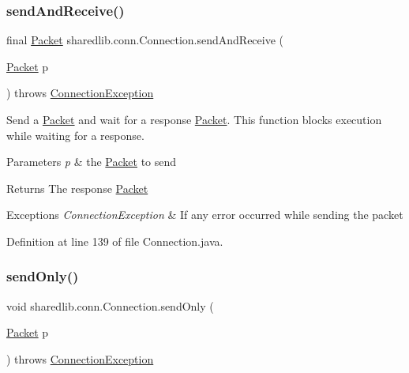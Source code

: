 \subsubsection{\texorpdfstring{send\+And\+Receive()}{sendAndReceive()}}
{\footnotesize\ttfamily final \hyperlink{classsharedlib_1_1conn_1_1_packet}{Packet} sharedlib.\+conn.\+Connection.\+send\+And\+Receive (\begin{DoxyParamCaption}\item[{\hyperlink{classsharedlib_1_1conn_1_1_packet}{Packet}}]{p }\end{DoxyParamCaption}) throws \hyperlink{classsharedlib_1_1exceptions_1_1_connection_exception}{Connection\+Exception}}

Send a \hyperlink{classsharedlib_1_1conn_1_1_packet}{Packet} and wait for a response \hyperlink{classsharedlib_1_1conn_1_1_packet}{Packet}. This function blocks execution while waiting for a response. 
\begin{DoxyParams}{Parameters}
{\em p} & the \hyperlink{classsharedlib_1_1conn_1_1_packet}{Packet} to send \\
\hline
\end{DoxyParams}
\begin{DoxyReturn}{Returns}
The response \hyperlink{classsharedlib_1_1conn_1_1_packet}{Packet} 
\end{DoxyReturn}

\begin{DoxyExceptions}{Exceptions}
{\em Connection\+Exception} & If any error occurred while sending the packet \\
\hline
\end{DoxyExceptions}


Definition at line 139 of file Connection.\+java.

\hypertarget{classsharedlib_1_1conn_1_1_connection_a9b905c55314bb83fa7b35c5f22672276}{}\label{classsharedlib_1_1conn_1_1_connection_a9b905c55314bb83fa7b35c5f22672276} 
\subsubsection{\texorpdfstring{send\+Only()}{sendOnly()}}
{\footnotesize\ttfamily void sharedlib.\+conn.\+Connection.\+send\+Only (\begin{DoxyParamCaption}\item[{\hyperlink{classsharedlib_1_1conn_1_1_packet}{Packet}}]{p }\end{DoxyParamCaption}) throws \hyperlink{classsharedlib_1_1exceptions_1_1_connection_exception}{Connection\+Exception}}

